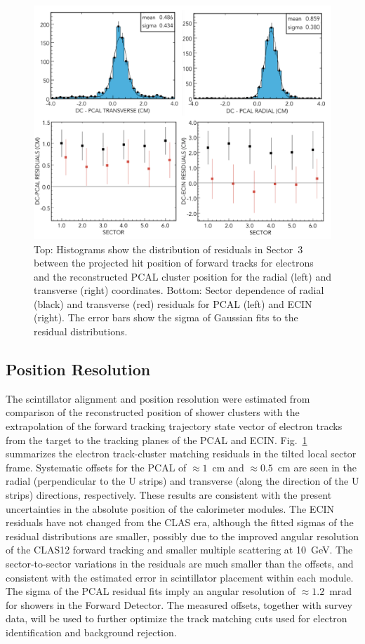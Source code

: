 \begin{figure}[t]
\centering
\includegraphics[width=1.0\columnwidth,keepaspectratio]{img/S10_1_3.png}
\caption[]{Top: Histograms show the distribution of residuals in Sector~3 between the projected hit position of
  forward tracks for electrons and the reconstructed PCAL cluster position for the radial (left) and transverse
  (right) coordinates. Bottom: Sector dependence of radial (black) and transverse (red) residuals for PCAL (left)
  and ECIN (right). The error bars show the sigma of Gaussian fits to the residual distributions.}
\label{fig:S10_1_3}
\end{figure}

\subsection{Position Resolution}

The scintillator alignment and position resolution were estimated from comparison of the reconstructed position of
shower clusters with the extrapolation of the forward tracking trajectory state vector of electron tracks from the
target to the tracking planes of the PCAL and ECIN. Fig.~\ref{fig:S10_1_3} summarizes the electron track-cluster
matching residuals in the tilted local sector frame. Systematic offsets for the PCAL of $\approx 1$~cm and
$\approx 0.5$~cm are seen in the radial (perpendicular to the U strips) and transverse (along the direction of the
U strips) directions, respectively. These results are consistent with the present uncertainties in the absolute
position of the calorimeter modules.  The ECIN residuals have not changed from the CLAS era, although the fitted sigmas of the residual
distributions are smaller, possibly due to the improved angular resolution of the CLAS12 forward tracking and
smaller multiple scattering at 10~GeV. The sector-to-sector variations in the residuals are much smaller than the offsets,
and consistent with the estimated error in scintillator placement within each module.  The sigma of the PCAL residual fits imply an angular resolution of $\approx 1.2$~mrad
for showers in the Forward Detector. The measured offsets, together with survey data, will be used to further
optimize the track matching cuts used for electron identification and background rejection. 

